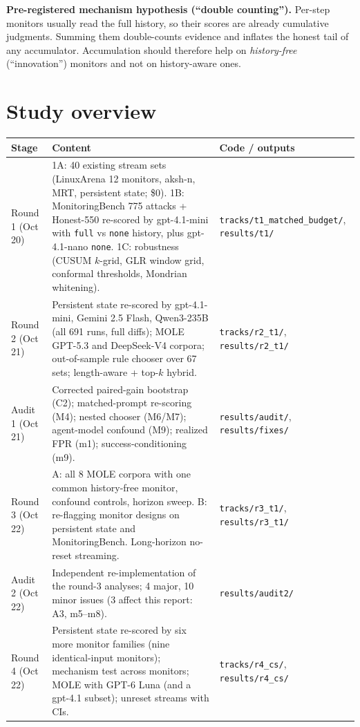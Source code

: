 \documentclass[11pt]{article}
\begin{document}
\textbf{Pre-registered mechanism hypothesis (``double counting'').} Per-step monitors usually read the full history, so their scores are already cumulative judgments. Summing them double-counts evidence and inflates the honest tail of any accumulator. Accumulation should therefore help on \emph{history-free} (``innovation'') monitors and not on history-aware ones.

\section{Study overview}

\begin{table}[!htbp]\centering\small
\begin{tabularx}{\linewidth}{@{}>{\raggedright\arraybackslash}p{2.3cm}>{\raggedright\arraybackslash}X>{\raggedright\arraybackslash}p{2.6cm}@{}}
\toprule
Stage & Content & Code / outputs\\
\midrule
Round 1 (Oct 20) & 1A: 40 existing stream sets (LinuxArena 12 monitors, aksh-n, MRT, persistent state; \$0). 1B: MonitoringBench 775 attacks + Honest-550 re-scored by gpt-4.1-mini with \texttt{full} vs \texttt{none} history, plus gpt-4.1-nano \texttt{none}. 1C: robustness (CUSUM $k$-grid, GLR window grid, conformal thresholds, Mondrian whitening). & \nolinkurl{tracks/t1_matched_budget/}, \nolinkurl{results/t1/}\\
Round 2 (Oct 21) & Persistent state re-scored by gpt-4.1-mini, Gemini 2.5 Flash, Qwen3-235B (all 691 runs, full diffs); MOLE GPT-5.3 and DeepSeek-V4 corpora; out-of-sample rule chooser over 67 sets; length-aware + top-$k$ hybrid. & \nolinkurl{tracks/r2_t1/}, \nolinkurl{results/r2_t1/}\\
Audit 1 (Oct 21) & Corrected paired-gain bootstrap (C2); matched-prompt re-scoring (M4); nested chooser (M6/M7); agent-model confound (M9); realized FPR (m1); success-conditioning (m9). & \nolinkurl{results/audit/}, \nolinkurl{results/fixes/}\\
Round 3 (Oct 22) & A: all 8 MOLE corpora with one common history-free monitor, confound controls, horizon sweep. B: re-flagging monitor designs on persistent state and MonitoringBench. Long-horizon no-reset streaming. & \nolinkurl{tracks/r3_t1/}, \nolinkurl{results/r3_t1/}\\
Audit 2 (Oct 22) & Independent re-implementation of the round-3 analyses; 4 major, 10 minor issues (3 affect this report: A3, m5--m8). & \nolinkurl{results/audit2/}\\
Round 4 (Oct 22) & Persistent state re-scored by six more monitor families (nine identical-input monitors); mechanism test across monitors; MOLE with GPT-6 Luna (and a gpt-4.1 subset); unreset streams with CIs. & \nolinkurl{tracks/r4_cs/}, \nolinkurl{results/r4_cs/}\\

\end{tabularx}
\end{table}
\end{document}
